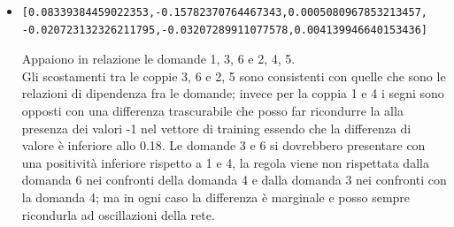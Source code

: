 \begin{itemize}
\item \begin{verbatim}[0.08339384459022353,-0.15782370764467343,0.0005080967853213457,
-0.020723132326211795,-0.03207289911077578,0.004139946640153436]
\end{verbatim}
Appaiono in relazione le domande 1, 3, 6 e 2, 4, 5.\\
Gli scostamenti tra le coppie 3, 6 e 2, 5 sono consistenti con quelle che sono le relazioni di dipendenza fra le domande; invece per la coppia 1 e 4 i segni sono opposti con una differenza trascurabile che posso far ricondurre la alla presenza dei valori -1 nel vettore di training essendo che la differenza di valore \`e inferiore allo 0.18.
Le domande 3 e 6 si dovrebbero presentare con una positivit\`a inferiore rispetto a 1 e 4, la regola viene non rispettata dalla domanda 6 nei confronti della domanda 4  e dalla domanda 3 nei confronti con la domanda 4; ma in ogni caso la differenza \`e marginale  e posso sempre ricondurla ad oscillazioni della rete.
\end{itemize}


